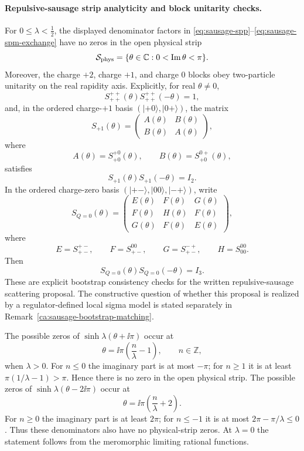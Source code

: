 \paragraph{Repulsive-sausage strip analyticity and block unitarity checks.}
For \(0\le\lambda<\frac12\), the displayed denominator factors in
\eqref{eq:sausage-spp}--\eqref{eq:sausage-spm-exchange} have no zeros in the
open physical strip
\[
  \mathcal S_{\rm phys}=\{\theta\in\mathbb C:0<\operatorname{Im}\theta<\pi\}.
\]
Moreover, the charge \(+2\), charge \(+1\), and charge \(0\) blocks obey
two-particle unitarity on the real rapidity axis.  Explicitly, for real
\(\theta\ne0\),
\[
  S_{++}^{++}(\theta)S_{++}^{++}(-\theta)=1,
\]
and, in the ordered charge-\(+1\) basis \((|+0\rangle,|0+\rangle)\), the
matrix
\[
  S_{+1}(\theta)=
  \begin{pmatrix}
    A(\theta)&B(\theta)\\
    B(\theta)&A(\theta)
  \end{pmatrix},
\]
where
\[
  A(\theta)=S_{+0}^{+0}(\theta),
  \qquad
  B(\theta)=S_{+0}^{0+}(\theta),
\]
satisfies
\[
  S_{+1}(\theta)S_{+1}(-\theta)=I_2 .
\]
In the ordered charge-zero basis \((|+-\rangle,|00\rangle,|-+\rangle)\),
write
\[
  S_{Q=0}(\theta)=
  \begin{pmatrix}
    E(\theta)&F(\theta)&G(\theta)\\
    F(\theta)&H(\theta)&F(\theta)\\
    G(\theta)&F(\theta)&E(\theta)
  \end{pmatrix},
\]
where
\[
  E=S_{+-}^{+-},\qquad
  F=S_{+-}^{00},\qquad
  G=S_{+-}^{-+},\qquad
  H=S_{00}^{00}.
\]
Then
\[
  S_{Q=0}(\theta)S_{Q=0}(-\theta)=I_3 .
\]
These are explicit bootstrap consistency checks for the written
repulsive-sausage scattering proposal.  The constructive question of whether
this proposal is realized by a regulator-defined local sigma model is stated
separately in Remark~\ref{ca:sausage-bootstrap-matching}.

The possible zeros of \(\sinh\lambda(\theta+\ii\pi)\) occur at
\[
  \theta=\ii\pi\left(\frac n\lambda-1\right),
  \qquad n\in\mathbb Z,
\]
when \(\lambda>0\).  For \(n\le0\) the imaginary part is at most \(-\pi\);
for \(n\ge1\) it is at least \(\pi(1/\lambda-1)>\pi\).  Hence there is no
zero in the open physical strip.  The possible zeros of
\(\sinh\lambda(\theta-2\ii\pi)\) occur at
\[
  \theta=\ii\pi\left(\frac n\lambda+2\right).
\]
For \(n\ge0\) the imaginary part is at least \(2\pi\); for \(n\le-1\) it is
at most \(2\pi-\pi/\lambda\le0\).  Thus these denominators also have no
physical-strip zeros.  At \(\lambda=0\) the statement follows from the
meromorphic limiting rational functions.

